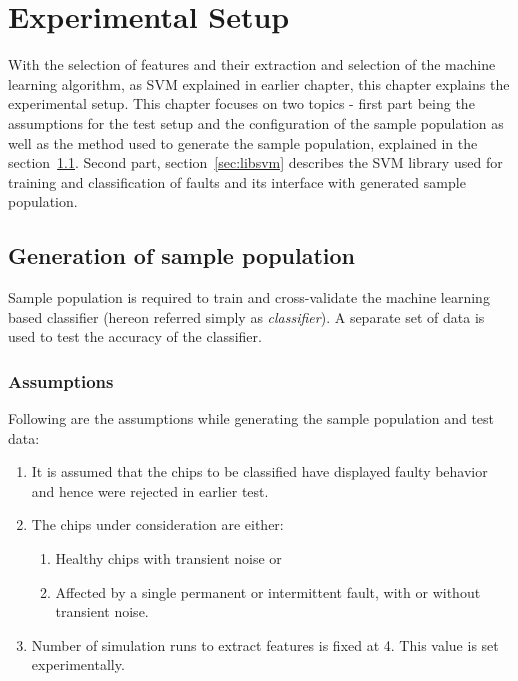 \chapter{Experimental Setup}
\label{chap:chapter5}
With the selection of features and their extraction and selection of the machine learning algorithm, as SVM explained in earlier chapter, this chapter explains the experimental setup. This chapter focuses on two topics - first part being the assumptions for the test setup and the configuration of the sample population as well as the method used to generate the sample population, explained in the section~\ref{sec:gsp}. Second part, section~\ref{sec:libsvm} describes the SVM library used for training and classification of faults and its interface with generated sample population.
\section{Generation of sample population}
\label{sec:gsp}
Sample population is required to train and cross-validate the machine learning based classifier (hereon referred simply as \emph{classifier}). A separate set of data is used to test the accuracy of the classifier.
\subsection{Assumptions}
\label{sec:gsp:assumptions}
Following are the assumptions while generating the sample population and test data:
\begin{enumerate}
  \item It is assumed that the chips to be classified have displayed faulty behavior and hence were rejected in earlier test.
  \item The chips under consideration are either:
		  \begin{enumerate}
    		\item Healthy chips with transient noise or
    		\item Affected by a single permanent or intermittent fault, with or without transient noise.
 		 \end{enumerate}
	\item Number of simulation runs to extract features is fixed at 4. This value is set experimentally. 
\end{enumerate}

